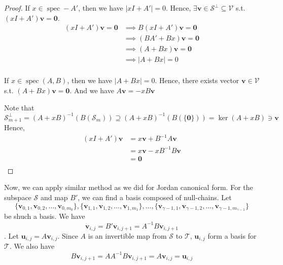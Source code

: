 \documentclass{article}
\newcommand{\0}{\mathbf{0}}
\renewcommand{\vec}{\mathbf}
\newcommand{\vv}{\vec{v}}
\newcommand{\vu}{\vec{u}}
\newcommand{\inv}{^{-1}}
\newcommand{\vecspace}[1]{\mathcal{#1}}
\newcommand{\vsV}{\vecspace{V}}
\newcommand{\vsS}{\vecspace{S}}
\newcommand{\vsT}{\vecspace{T}}
\newcommand{\vsSp}{\vecspace{S}^\perp}
\newcommand{\id}{I}
\DeclareMathOperator{\spec}{spec}
\begin{document}
\begin{proof}
    If $x\in\spec -A'$, then we have $|x\id+A'|=0$.
    Hence, $\exists\vv\in\vsSp\subseteq\vsV$ s.t. $(x\id+A')\vv=\0$.
    \begin{align*}
        (x\id+A')\vv=\0
        &\implies B(x\id+A')\vv=\0\\
        &\implies (BA'+Bx)\vv=\0\\
        &\implies (A+Bx)\vv=\0\\
        &\implies |A+Bx|=0\\
    \end{align*}

    If $x\in\spec(A, B)$, then we have $|A+Bx|=0$.
    Hence, there exists vector $\vv\in\vsV$ s.t. $(A+Bx)\vv=\0$.
    And we have $A\vv=-xB\vv$

    Note that
    \begin{equation*}
        \vsSp_{m+1}=(A+xB)\inv(B(\vsS_m))\supseteq(A+xB)\inv(B(\{\0\}))=\ker(A+xB)\ni\vv
    \end{equation*}
    Hence,
    \begin{align*}
        (x\id+A')\vv
        &=x\vv+B\inv A\vv\\
        &=x\vv-xB\inv B\vv\\
        &=\0\\
    \end{align*}
\end{proof}


Now, we can apply similar method as we did for Jordan canonical form.
For the subspace $\vsS$ and map $B'$, we can find a basis composed of null-chains.
Let $$\{\vv_{0,1},\vv_{0,2},\dots,\vv_{0,m_0}\}, \{\vv_{1,1},\vv_{1,2},\dots,\vv_{1,m_1}\}, \dots, \{\vv_{\gamma-1,1},\vv_{\gamma-1,2},\dots,\vv_{\gamma-1,m_{\gamma-1}}\}$$ be shuch a basis.
We have $$\vv_{i,j}=B'\vv_{i,j+1}=A\inv B\vv_{i,j+1}$$.
Let $\vu_{i,j}=A\vv_{i,j}$. Since $A$ is an invertible map from $\vsS$ to $\vsT$, $\vu_{i,j}$ form a basis for $\vsT$.
We also have
\begin{equation*}
    B\vv_{i,j+1}=AA\inv B\vv_{i,j+1}=A\vv_{i,j}=\vu_{i,j}
\end{equation*}
\end{document}
